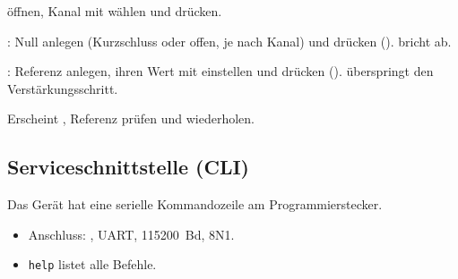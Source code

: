 \begin{steps}
    \item {} öffnen, Kanal mit \enc{} wählen und  drücken.
    \item {}: Null anlegen (Kurzschluss oder offen, je nach Kanal) und 
          drücken ().  bricht ab.
    \item {}: Referenz anlegen, ihren Wert mit \enc{} einstellen und
           drücken ().  überspringt den Verstärkungsschritt.
    \item Erscheint , Referenz prüfen und wiederholen.
\end{steps}

\subsection{Serviceschnittstelle (CLI)}
\label{sec:cli}
Das Gerät hat eine serielle Kommandozeile am Programmierstecker.
\begin{itemize}
    \item Anschluss: , UART, \qty{115200}{Bd}, 8N1.
    \item \texttt{help} listet alle Befehle.
\end{itemize}

